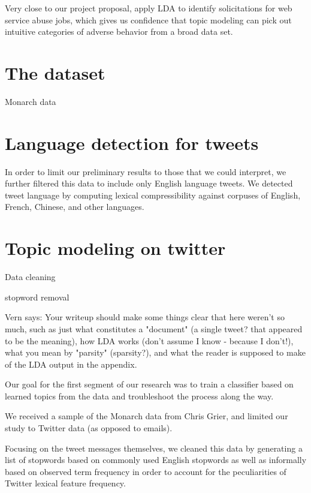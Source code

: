 \documentclass[times, 11pt, twocolumn]{article}
\begin{document}
Very close to our project proposal, \cite{Kim2011} apply LDA to identify solicitations for web service abuse jobs, which gives us confidence that topic modeling can pick out intuitive categories of adverse behavior from a broad data set. 


\section{The dataset}

Monarch data



\section{Language detection for tweets}

In order to limit our preliminary results to those that we could interpret, we further filtered this data to include only English language tweets.  We detected tweet language by computing lexical compressibility against corpuses of English, French, Chinese, and other languages.

\section{Topic modeling on twitter}

Data cleaning 

stopword removal



Vern says: Your writeup should make some things clear that here weren't so much, such as just what constitutes a "document" (a single tweet? that appeared to be the meaning), how LDA works (don't assume I know - because I don't!), what you mean by "parsity" (sparsity?), and what the reader is supposed to make of the      LDA output in the appendix.

Our  goal for the first segment of our research was to train a classifier  based on learned topics from the data and troubleshoot the process along  the way.

We received a sample of the Monarch data from Chris Grier, and limited our study to Twitter data (as opposed to emails).  

Focusing on the tweet messages themselves, we cleaned this data by generating a list of stopwords based on commonly used English stopwords as well as informally based on observed term frequency in order to account for the peculiarities of Twitter lexical feature frequency.
\end{document}

